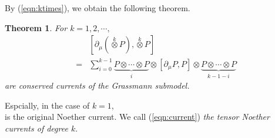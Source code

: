 \documentclass[makeidx,12pt,openany]{report}
\newtheorem{thm}[df]{Theorem}
\begin{document}
By (\ref{eqn:ktimes}), we obtain the following theorem. 
\begin{thm}For $k=1,2,\cdots,$
\begin{eqnarray}
&& [\partial_{\mu}(\stackrel{k}{\otimes} \! P)
    ,\stackrel{k}{\otimes} \! P] \label{eqn:current}\\
&=& \sum_{i=0}^{k-1} 
    \underbrace{P \otimes \cdots \otimes P}_i
      \otimes [\partial_{\mu}P,P] \otimes 
    \underbrace{P \otimes \cdots \otimes P}_{k-1-i} \nonumber
\end{eqnarray}
are conserved currents of the Grassmann submodel. 
\end{thm}
Espcially, in the case of $k=1$, 
\begin{equation}
 [\partial_{\mu}P,P]
\end{equation}
is the original Noether current. We call (\ref{eqn:current}) 
{\it{the tensor Noether currents of degree $k$}}. 
\end{document}
